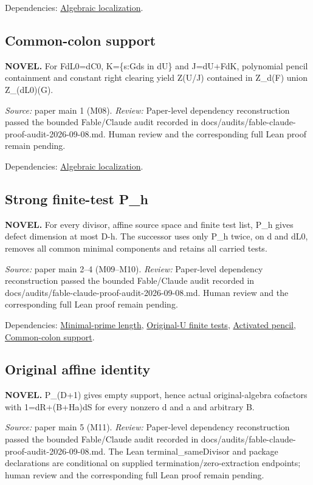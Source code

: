Dependencies: \hyperlink{claim:local}{Algebraic localization}.
\subsection{Common-colon support}\hypertarget{claim:colon}{}\backmap
\textbf{NOVEL.} For FdL0=dC0, K=\{s:Gds in dU\} and J=dU+FdK, polynomial pencil containment and constant right clearing yield Z(U/J) contained in Z\_d(F) union Z\_(dL0)(G).

\emph{Source:} paper main 1 (M08).
\emph{Review:} Paper-level dependency reconstruction passed the bounded Fable/Claude audit recorded in docs/audits/fable-claude-proof-audit-2026-09-08.md. Human review and the corresponding full Lean proof remain pending.

Dependencies: \hyperlink{claim:local}{Algebraic localization}.
\subsection{Strong finite-test P\_h}\hypertarget{claim:induction}{}\backmap
\textbf{NOVEL.} For every divisor, affine source space and finite test list, P\_h gives defect dimension at most D-h. The successor uses only P\_h twice, on d and dL0, removes all common minimal components and retains all carried tests.

\emph{Source:} paper main 2–4 (M09–M10).
\emph{Review:} Paper-level dependency reconstruction passed the bounded Fable/Claude audit recorded in docs/audits/fable-claude-proof-audit-2026-09-08.md. Human review and the corresponding full Lean proof remain pending.

Dependencies: \hyperlink{claim:length}{Minimal-prime length}, \hyperlink{claim:tests}{Original-U finite tests}, \hyperlink{claim:pencil}{Activated pencil}, \hyperlink{claim:colon}{Common-colon support}.
\subsection{Original affine identity}\hypertarget{claim:terminal}{}\backmap
\textbf{NOVEL.} P\_(D+1) gives empty support, hence actual original-algebra cofactors with 1=dR+(B+Ha)dS for every nonzero d and a and arbitrary B.

\emph{Source:} paper main 5 (M11).
\emph{Review:} Paper-level dependency reconstruction passed the bounded Fable/Claude audit recorded in docs/audits/fable-claude-proof-audit-2026-09-08.md. The Lean terminal\_sameDivisor and package declarations are conditional on supplied termination/zero-extraction endpoints; human review and the corresponding full Lean proof remain pending.

